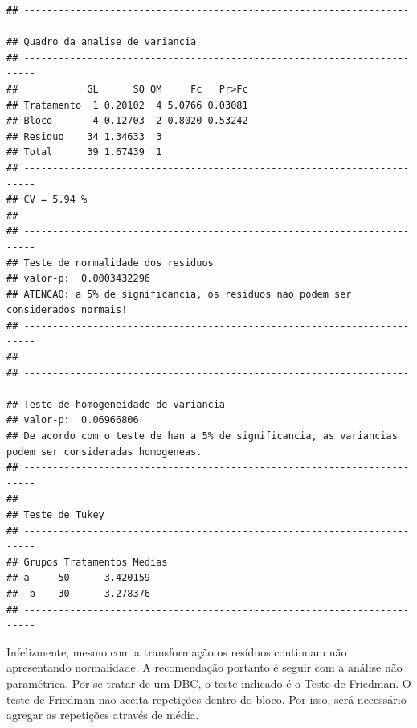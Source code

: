 \documentclass[
]{article}
\newenvironment{Shaded}{\begin{snugshade}}{\end{snugshade}}
\newcommand{\DataTypeTok}[1]{\textcolor[rgb]{0.13,0.29,0.53}{#1}}
\newcommand{\KeywordTok}[1]{\textcolor[rgb]{0.13,0.29,0.53}{\textbf{#1}}}
\newcommand{\NormalTok}[1]{#1}
\newcommand{\OperatorTok}[1]{\textcolor[rgb]{0.81,0.36,0.00}{\textbf{#1}}}
\newcommand{\StringTok}[1]{\textcolor[rgb]{0.31,0.60,0.02}{#1}}
\begin{document}
\begin{verbatim}
## ------------------------------------------------------------------------
## Quadro da analise de variancia
## ------------------------------------------------------------------------
##            GL      SQ QM     Fc   Pr>Fc
## Tratamento  1 0.20102  4 5.0766 0.03081
## Bloco       4 0.12703  2 0.8020 0.53242
## Residuo    34 1.34633  3               
## Total      39 1.67439  1               
## ------------------------------------------------------------------------
## CV = 5.94 %
## 
## ------------------------------------------------------------------------
## Teste de normalidade dos residuos 
## valor-p:  0.0003432296 
## ATENCAO: a 5% de significancia, os residuos nao podem ser considerados normais!
## ------------------------------------------------------------------------
## 
## ------------------------------------------------------------------------
## Teste de homogeneidade de variancia 
## valor-p:  0.06966806 
## De acordo com o teste de han a 5% de significancia, as variancias podem ser consideradas homogeneas.
## ------------------------------------------------------------------------
## 
## Teste de Tukey
## ------------------------------------------------------------------------
## Grupos Tratamentos Medias
## a     50      3.420159 
##  b    30      3.278376 
## ------------------------------------------------------------------------
\end{verbatim}

Infelizmente, mesmo com a transformação os resíduos continuam não apresentando normalidade. A recomendação portanto é seguir com a análise não paramétrica. Por se tratar de um DBC, o teste indicado é o Teste de Friedman. O teste de Friedman não aceita repetições dentro do bloco. Por isso, será necessário agregar as repetições através de média.

\begin{Shaded}
\end{Shaded}
\end{document}
